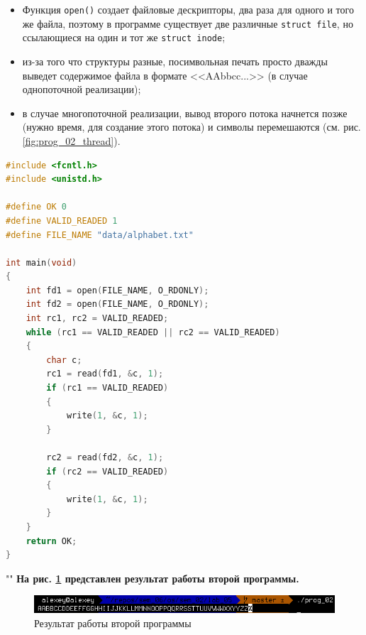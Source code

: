 \documentclass[12pt]{report}
\begin{document}
\begin{itemize}
	\item Функция \texttt{open()} создает файловые дескрипторы, два раза для одного и того же файла, поэтому в программе существует две различные \texttt{struct file}, но ссылающиеся на один и тот же \texttt{struct inode};
	\item из-за того что структуры разные, посимвольная печать просто дважды выведет содержимое файла в формате <<AAbbcc...>> (в случае однопоточной реализации); 
	\item в случае многопоточной реализации, вывод второго потока начнется позже (нужно время, для создание этого потока) и символы перемешаются (см. рис. \ref{fig:prog_02_thread}).
\end{itemize}

\begin{lstlisting}[language=c, label=p2, caption=Программа №2]
#include <fcntl.h>
#include <unistd.h>

#define OK 0
#define VALID_READED 1
#define FILE_NAME "data/alphabet.txt"

int main(void)
{
	int fd1 = open(FILE_NAME, O_RDONLY);
	int fd2 = open(FILE_NAME, O_RDONLY);
	int rc1, rc2 = VALID_READED;
	while (rc1 == VALID_READED || rc2 == VALID_READED)
	{
		char c;
		rc1 = read(fd1, &c, 1);
		if (rc1 == VALID_READED)
		{
			write(1, &c, 1);
		}

		rc2 = read(fd2, &c, 1);
		if (rc2 == VALID_READED)
		{
			write(1, &c, 1);
		}
	}
	return OK;
}
\end{lstlisting}

""\newline
\textbf{На рис. \ref{fig:prog_02} представлен результат работы второй программы.}

\begin{figure}[H]
	\centering
	\includegraphics[scale=0.9]{img/prog_02.png}
	\caption{Результат работы второй программы}
	\label{fig:prog_02}
\end{figure}
\end{document}
